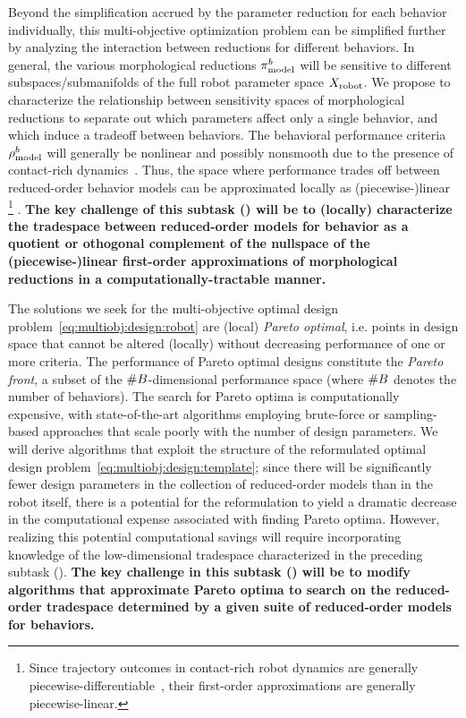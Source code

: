 \documentclass[11pt]{article}
\begin{document}
Beyond the simplification accrued by the parameter reduction for each behavior individually, this multi-objective optimization problem can be simplified further by analyzing the interaction between reductions for different behaviors. 
In general, the various morphological reductions $\pi^{b}_{\text{model}}$ will be sensitive to different subspaces/submanifolds of the full robot parameter space $X_{\text{robot}}$. 
We propose to characterize the relationship between sensitivity spaces of morphological reductions to separate out which parameters affect only a single behavior, and which induce a tradeoff between behaviors. 
The behavioral performance criteria $\rho_{\text{model}}^{b}$ will generally be nonlinear and possibly nonsmooth due to the presence of contact-rich dynamics~\cite{Banjanin2017-sp}. 
Thus, the space where performance trades off between reduced-order behavior models can be approximated locally as (piecewise-)linear%
%
\footnote{Since trajectory outcomes in contact-rich robot dynamics are generally piecewise-differentiable~\cite{Pace2017-tt}, their first-order approximations are generally piecewise-linear.}%
%
.
{\bf The key challenge of this subtask () will be to (locally) characterize the tradespace between reduced-order models for behavior as a quotient or othogonal complement of the nullspace of the (piecewise-)linear first-order approximations of morphological reductions in a computationally-tractable manner.}

The solutions we seek for the multi-objective optimal design problem~\eqref{eq:multiobj:design:robot} are (local) \emph{Pareto optimal}, 
i.e. points in design space that cannot be altered (locally) without decreasing performance of one or more criteria.
The performance of Pareto optimal designs constitute the \emph{Pareto front},
a subset of the $\#{B}$-dimensional performance space (where $\#{B}$ denotes the number of behaviors).
The search for Pareto optima is computationally expensive, with state-of-the-art algorithms employing brute-force or sampling-based approaches that scale poorly with the number of design parameters.
We will derive algorithms that exploit the structure of the reformulated optimal design problem~\eqref{eq:multiobj:design:template}; since there will be significantly fewer design parameters in the collection of reduced-order models than in the robot itself, there is a potential for the reformulation to yield a dramatic decrease in the computational expense associated with finding Pareto optima.
However, realizing this potential computational savings will require incorporating knowledge of the low-dimensional tradespace characterized in the preceding subtask ().
{\bf The key challenge in this subtask () will be to modify algorithms that approximate Pareto optima to search on the reduced-order tradespace determined by a given suite of reduced-order models for behaviors.}
\end{document}
